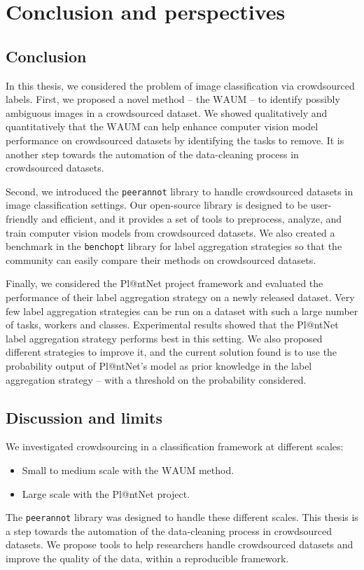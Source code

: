 \chapter{Conclusion and perspectives}

\section{Conclusion}
In this thesis, we considered the problem of image classification via crowdsourced labels.
First, we proposed a novel method -- the $\mathrm{WAUM}$ -- to identify possibly ambiguous images in a crowdsourced dataset.
We showed qualitatively and quantitatively that the $\mathrm{WAUM}$ can help enhance computer vision model performance on crowdsourced datasets by identifying the tasks to remove.
It is another step towards the automation of the data-cleaning process in crowdsourced datasets.

Second, we introduced the \texttt{peerannot} library to handle crowdsourced datasets in image classification settings.
Our open-source library is designed to be user-friendly and efficient, and it provides a set of tools to preprocess, analyze, and train computer vision models from crowdsourced datasets.
We also created a benchmark in the \texttt{benchopt} library for label aggregation strategies so that the community can easily compare their methods on crowdsourced datasets.

Finally, we considered the Pl@ntNet project framework and evaluated the performance of their label aggregation strategy on a newly released dataset.
Very few label aggregation strategies can be run on a dataset with such a large number of tasks, workers and classes.
Experimental results showed that the Pl@ntNet label aggregation strategy performs best in this setting.
We also proposed different strategies to improve it, and the current solution found is to use the probability output of Pl@ntNet's model as prior knowledge in the label aggregation strategy -- with a threshold on the probability considered.

\section{Discussion and limits}

We investigated crowdsourcing in a classification framework at different scales:
\begin{itemize}
    \item Small to medium scale with the $\mathrm{WAUM}$ method.
    \item Large scale with the Pl@ntNet project.
\end{itemize}
The \texttt{peerannot} library was designed to handle these different scales.
This thesis is a step towards the automation of the data-cleaning process in crowdsourced datasets. We propose tools to help researchers handle crowdsourced datasets and improve the quality of the data, within a reproducible framework.

